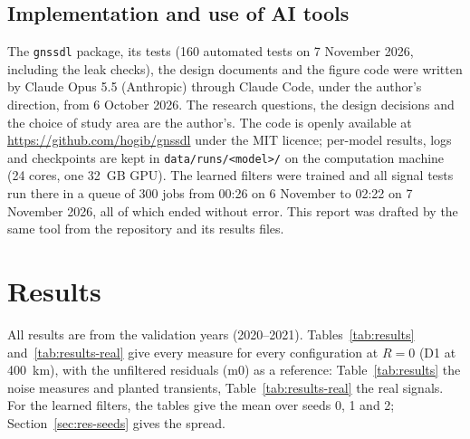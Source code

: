 \documentclass[preprint,12pt,authoryear]{elsarticle}
\begin{document}
\subsection{Implementation and use of AI tools}
\label{sec:ai}

The \texttt{gnssdl} package, its tests (160 automated tests on 7 November 2026, including the leak checks), the design documents and the figure code were written by Claude Opus 5.5 (Anthropic) through Claude Code, under the author's direction, from 6 October 2026. The research questions, the design decisions and the choice of study area are the author's. The code is openly available at \url{https://github.com/hogib/gnssdl} under the MIT licence; per-model results, logs and checkpoints are kept in \texttt{data/runs/<model>/} on the computation machine (24 cores, one 32~GB GPU). The learned filters were trained and all signal tests run there in a queue of 300 jobs from 00:26 on 6 November to 02:22 on 7 November 2026, all of which ended without error. This report was drafted by the same tool from the repository and its results files.

\section{Results}
\label{sec:results}

All results are from the validation years (2020--2021). Tables~\ref{tab:results} and~\ref{tab:results-real} give every measure for every configuration at $R = 0$ (D1 at 400~km), with the unfiltered residuals (m0) as a reference: Table~\ref{tab:results} the noise measures and planted transients, Table~\ref{tab:results-real} the real signals. For the learned filters, the tables give the mean over seeds 0, 1 and 2; Section~\ref{sec:res-seeds} gives the spread.
\end{document}
